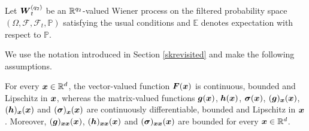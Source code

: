 Let $\boldsymbol{W}^{(q_2)}_{t}$ be an $\mathbb{R}^{q_2}$-valued Wiener process on the filtered probability space $(\Omega, \mathcal{F}, \mathcal{F}_{t}, \mathbb{P})$ satisfying the usual conditions \cite{karatzas2012Brownian} and $\mathbb{E}$ denotes expectation with respect to $\mathbb{P}$. 



We use the notation introduced in Section \ref{skrevisited} and make the following assumptions. 




\begin{ass} \label{ass1} For every $\boldsymbol{x} \in \mathbb{R}^{d}$, the vector-valued function $\boldsymbol{F}(\boldsymbol{x})$ is continuous, bounded and Lipschitz in $\boldsymbol{x}$, whereas the matrix-valued functions $\boldsymbol{g}(\boldsymbol{x})$, $\boldsymbol{h}(\boldsymbol{x})$, $\boldsymbol{\sigma}(\boldsymbol{x})$, $(\boldsymbol{g})_{\boldsymbol{x}}(\boldsymbol{x})$, $(\boldsymbol{h})_{\boldsymbol{x}}(\boldsymbol{x})$ and $(\boldsymbol{\sigma})_{\boldsymbol{x}}(\boldsymbol{x})$   are continuously differentiable, bounded and Lipschitz in $\boldsymbol{x}$.  Moreover,   $(\boldsymbol{g})_{\boldsymbol{x}\boldsymbol{x}}(\boldsymbol{x})$, $(\boldsymbol{h})_{\boldsymbol{x}\boldsymbol{x}}(\boldsymbol{x})$ and $(\boldsymbol{\sigma})_{\boldsymbol{x}\boldsymbol{x}}(\boldsymbol{x})$ are bounded for every $\boldsymbol{x} \in \mathbb{R}^d$. 
\end{ass}

